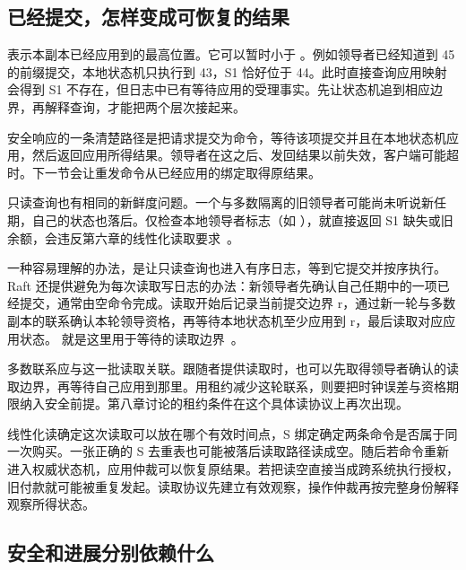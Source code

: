 \subsection*{已经提交，怎样变成可恢复的结果}

 表示本副本已经应用到的最高位置。它可以暂时小于 。例如领导者已经知道到 45 的前缀提交，本地状态机只执行到 43，S1 恰好位于 44。此时直接查询应用映射会得到 S1 不存在，但日志中已有等待应用的受理事实。先让状态机追到相应边界，再解释查询，才能把两个层次接起来。


安全响应的一条清楚路径是把请求提交为命令，等待该项提交并且在本地状态机应用，然后返回应用所得结果。领导者在这之后、发回结果以前失效，客户端可能超时。下一节会让重发命令从已经应用的绑定取得原结果。

只读查询也有相同的新鲜度问题。一个与多数隔离的旧领导者可能尚未听说新任期，自己的状态也落后。仅检查本地领导者标志（如 ），就直接返回 S1 缺失或旧余额，会违反第六章的线性化读取要求~\cite{raft,ongaro}。

一种容易理解的办法，是让只读查询也进入有序日志，等到它提交并按序执行。Raft 还提供避免为每次读取写日志的办法：新领导者先确认自己任期中的一项已经提交，通常由空命令完成。读取开始后记录当前提交边界 r，通过新一轮与多数副本的联系确认本轮领导资格，再等待本地状态机至少应用到 r，最后读取对应应用状态。 就是这里用于等待的读取边界~\cite{ongaro}。


多数联系应与这一批读取关联。跟随者提供读取时，也可以先取得领导者确认的读取边界，再等待自己应用到那里。用租约减少这轮联系，则要把时钟误差与资格期限纳入安全前提。第八章讨论的租约条件在这个具体读协议上再次出现。

线性化读确定这次读取可以放在哪个有效时间点，S 绑定确定两条命令是否属于同一次购买。一张正确的 S 去重表也可能被落后读取路径读成空。随后若命令重新进入权威状态机，应用仲裁可以恢复原结果。若把读空直接当成跨系统执行授权，旧付款就可能被重复发起。读取协议先建立有效观察，操作仲裁再按完整身份解释观察所得状态。

\subsection*{安全和进展分别依赖什么}

